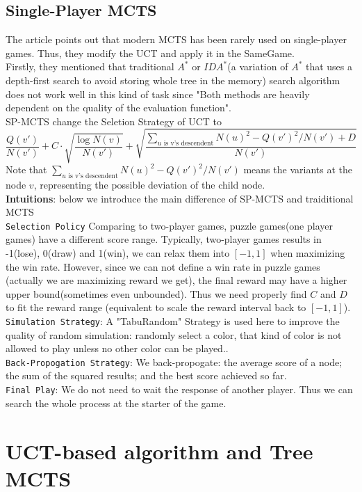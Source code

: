 \documentclass[11pt]{article}
\theoremstyle{definitionstyle}
\begin{document}
\subsection{Single-Player MCTS}
The article \cite{schadd2008single} points out that modern MCTS has been rarely used on single-player games. Thus, they modify the UCT and apply it in the SameGame.\\
Firstly, they mentioned that traditional $A^*$ or $IDA^*$(a variation of $A^*$ that uses a depth-first search to avoid storing whole tree in the memory) search algorithm does not work well in this kind of task since "Both methods are heavily dependent on the quality of the evaluation function".\\
SP-MCTS change the Seletion Strategy of UCT to 
\[
    \frac{Q(v')}{N(v')}+C\cdot\sqrt{\frac{\log N(v)}{N(v')}}+\sqrt{\frac{\sum_{u\text{ is v's descendent}}N(u)^2-Q(v')^2/N(v')+D}{N(v')}}
\]
Note that $\sum_{u\text{ is v's descendent}}N(u)^2-Q(v')^2/N(v')$ means the variants at the node $v$, representing the possible deviation of the child node.\\
\textbf{Intuitions}: below we introduce the main difference of SP-MCTS and traiditional MCTS\\ 
\texttt{Selection Policy} Comparing to two-player games, puzzle games(one player games) have a different score range. Typically, two-player games results in -1(lose), 0(draw) and 1(win), we can relax them into $[-1,1]$ when maximizing the win rate. However, since we can not define a win rate in puzzle games (actually we are maximizing reward we get), the final reward may have a higher upper bound(sometimes even unbounded). Thus we need properly find $C$ and $D$ to fit the reward range (equivalent to scale the reward interval back to $[-1,1]$).\\
\texttt{Simulation Strategy}: A "TabuRandom" Strategy is used here to improve the quality of random simulation: randomly select a color, that kind of color is not allowed to play unless no other color can be played..\\
\texttt{Back-Propogation Strategy}: We back-propogate: the average score of a node; the sum of the squared results; and the best score achieved so far.\\
\texttt{Final Play}: We do not need to wait the response of another player. Thus we can search the whole process at the starter of the game.
\section{UCT-based algorithm and Tree MCTS}
\end{document}
